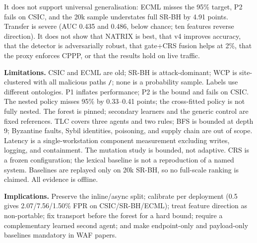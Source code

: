\documentclass[conference]{IEEEtran}
\begin{document}
It does not support universal generalisation: ECML misses the 95\% target, P2 fails on CSIC, and the 20k sample understates full SR-BH by 4.91 points. Transfer is severe (AUC 0.435 and 0.486, below chance; ten features reverse direction). It does not show that NATRIX is best, that v4 improves accuracy, that the detector is adversarially robust, that gate+CRS fusion helps at 2\%, that the proxy enforces CPPP, or that the results hold on live traffic.

\textbf{Limitations.} CSIC and ECML are old; SR-BH is attack-dominant; WCP is site-clustered with all malicious paths \texttt{/}; none is a probability sample. Labels use different ontologies. P1 inflates performance; P2 is the bound and fails on CSIC. The nested policy misses 95\% by 0.33--0.41 points; the cross-fitted policy is not fully nested. The forest is pinned; secondary learners and the generic control are fixed references. TLC covers three agents and two rules; BFS is bounded at depth 9; Byzantine faults, Sybil identities, poisoning, and supply chain are out of scope. Latency is a single-workstation component measurement excluding writes, logging, and containment. The mutation study is bounded, not adaptive. CRS is a frozen configuration; the lexical baseline is not a reproduction of a named system. Baselines are replayed only on 20k SR-BH, so no full-scale ranking is claimed. All evidence is offline.

\textbf{Implications.} Preserve the inline/async split; calibrate per deployment (0.5 gives 2.07/7.56/1.50\% FPR on CSIC/SR-BH/ECML); treat feature direction as non-portable; fix transport before the forest for a hard bound; require a complementary learned second agent; and make endpoint-only and payload-only baselines mandatory in WAF papers.
\end{document}
